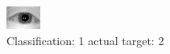 \begin{figure}[h!]
\begin{center}
\includegraphics[width=0.60\columnwidth]{figures/ID968_class_1_target_2.png}
\end{center}
\caption{ Classification: 1 actual target: 2}
\label{fig:ID968_class_1_target_2}
\end{figure}
